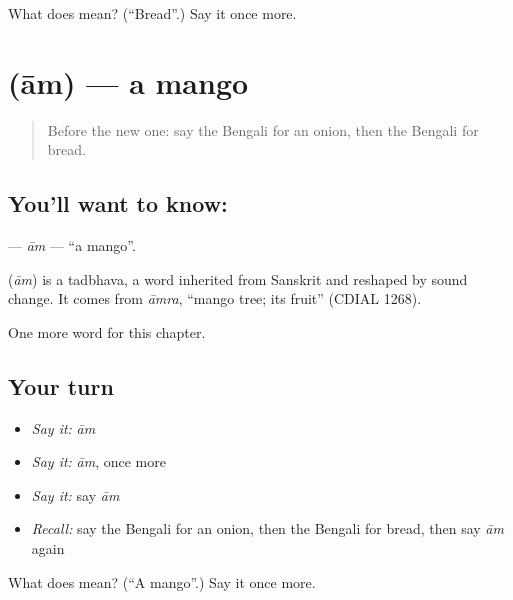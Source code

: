 \begin{tcolorbox}[breakable,colback=teal!4,colframe=teal!35!black,title={Before you move on}]
What does  mean? (\textquotedblleft{}Bread\textquotedblright{}.) Say it once more.
\end{tcolorbox}
\section[\texorpdfstring{\bn{আম} (ām)}{আম (ām)}]{ (ām) — a mango}

\label{lesson:BN-C59-am}



\begin{quote}
Before the new one: say the Bengali for an onion, then the Bengali for bread.
\end{quote}

\subsection*{You'll want to know: }
\textbf{} — \emph{ām} — \textquotedblleft{}a mango\textquotedblright{}.

\begin{cousinweb}
\textbf{} (\emph{ām}) is a tadbhava, a word inherited from Sanskrit and reshaped by sound change. It comes from \emph{āmra}, \textquotedblleft{}mango tree; its fruit\textquotedblright{} (CDIAL 1268).
\end{cousinweb}

\begin{grammarlens}[title={What you've built}]
One more word for this chapter.
\end{grammarlens}

\subsection*{Your turn}
\begin{itemize}
\raggedright
  \item \emph{Say it:} \emph{ām}
  \item \emph{Say it:} \emph{ām}, once more
  \item \emph{Say it:} say \emph{ām}
  \item \emph{Recall:} say the Bengali for an onion, then the Bengali for bread, then say \emph{ām} again
\end{itemize}

\begin{tcolorbox}[breakable,colback=teal!4,colframe=teal!35!black,title={Before you move on}]
What does  mean? (\textquotedblleft{}A mango\textquotedblright{}.) Say it once more.
\end{tcolorbox}
